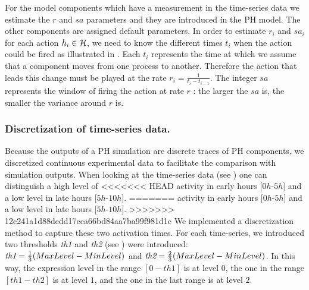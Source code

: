 For the model components which have a measurement in the time-series data we estimate the $r$ and $sa$ parameters and they are introduced in the PH model. 
The other components are 
assigned default parameters. In order to estimate $r_{i}$ and $sa_{i}$ for each action $h_{i} \in \mathcal{H}$, we need to know the different times $t_{i}$  when the action could be fired as illustrated 
in . Each  $t_{i}$ represents the time at which we assume that a component moves from one process to another. Therefore the action that leads this 
change must be played at the rate $r_{i}=\frac{1}{t_{i}-t_{i-1}}$. The integer $sa$ represents the window of firing the action at rate $r$ : the larger the $sa$ is, the smaller the variance around $r$ is. 

\subsubsection{Discretization of time-series data.}

Because the outputs of a PH simulation are discrete traces of PH components, we discretized continuous experimental data to facilitate 
the comparison with simulation outputs.
When looking at the time-series data (see ) one can distinguish a high level of
<<<<<<< HEAD
activity in early hours [$0h$-$5h$] and a low level in late hours [$5h$-$10h$]. 
=======
activity in early hours [$0h$-$5h$] and a low level in late hours [$5h$-$10h$]. 
>>>>>>> 12c241a1d88dedd17eca66bd84aa7ba99f981d1c
We implemented a discretization method to capture these
two activation times. For each time-series, we introduced two thresholds \emph{th1} and \emph{th2} (see ) were introduced: 
$\emph{th1}=\frac{1}{3}(MaxLevel-MinLevel)$ and $\emph{th2}=\frac{2}{3}(MaxLevel-MinLevel)$. 
In this way, the expression level in the range $[0-th1]$ is at level $0$, the one in the range $[th1-th2]$ is at level $1$, and the one in the last range is at
level $2$. 


